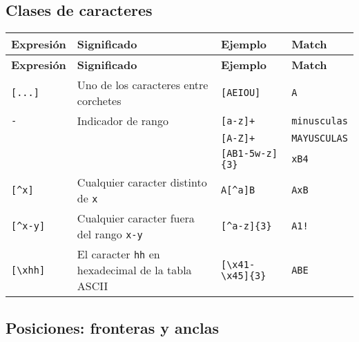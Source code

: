 \documentclass[a4paper, 10pt]{article}
\begin{document}
\subsection*{Clases de caracteres}

\begin{longtable}{@{} p{2cm} p{7.5cm} p{3cm} p{5cm} @{}}
\toprule
\textbf{Expresión} & \textbf{Significado} & \textbf{Ejemplo} & \textbf{Match} \\
\midrule
\endfirsthead
\toprule
\textbf{Expresión} & \textbf{Significado} & \textbf{Ejemplo} & \textbf{Match} \\
\midrule
\endhead
\bottomrule
\endfoot
\bottomrule
\endlastfoot

\centering \verb![...]!  & Uno de los caracteres entre corchetes                  & \verb![AEIOU]!        & \verb!A!          \\
\centering \verb!-!      & Indicador de rango                                     & \verb![a-z]+!         & \verb!minusculas! \\
                         &                                                        & \verb![A-Z]+!         & \verb!MAYUSCULAS! \\
                         &                                                        & \verb![AB1-5w-z]{3}!  & \verb!xB4!        \\
\centering \verb![^x]!   & Cualquier caracter distinto de \verb!x!                & \verb!A[^a]B!         & \verb!AxB!        \\
\centering \verb![^x-y]! & Cualquier caracter fuera del rango \verb!x-y!          & \verb![^a-z]{3}!      & \verb|A1!|        \\
\centering \verb![\xhh]! & El caracter \verb!hh! en hexadecimal de la tabla ASCII & \verb![\x41-\x45]{3}! & \verb!ABE!        \\
\end{longtable}


\subsection*{Posiciones: fronteras y anclas}
\end{document}

